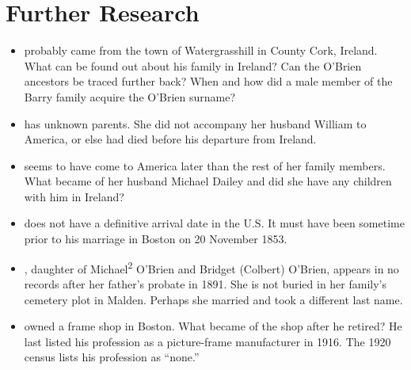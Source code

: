 \chapter{Further Research}

\begin{itemize}

	\item{} probably came from the town of Watergrasshill in County Cork, Ireland. What can be found out about his family in Ireland? Can the O'Brien ancestors be traced further back? When and how did a male member of the Barry family acquire the O'Brien surname?

	\item{} has unknown parents. She did not accompany her husband William to America, or else had died before his departure from Ireland. 

	\item{} seems to have come to America later than the rest of her family members. What became of her husband Michael Dailey and did she have any children with him in Ireland?

	\item{} does not have a definitive arrival date in the U.S. It must have been sometime prior to his marriage in Boston on 20 November 1853.

	\item{}, daughter of Michael\textsuperscript{2} O'Brien and Bridget (Colbert) O'Brien, appears in no records after her father's probate in 1891. She is not buried in her family's cemetery plot in Malden. Perhaps she married and took a different last name.

	\item{} owned a frame shop in Boston. What became of the shop after he retired? He last listed his profession as a picture-frame manufacturer in 1916. The 1920 census lists his profession as ``none.''

\end{itemize}